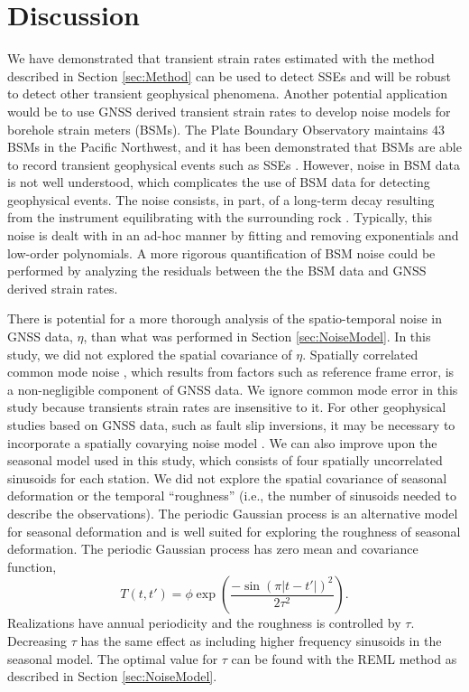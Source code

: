 \documentclass[10pt,letter]{article}
\begin{document}
\section{Discussion}\label{sec:Discussion}
We have demonstrated that transient strain rates estimated with the method described in Section \ref{sec:Method} can be used to detect SSEs and will be robust to detect other transient geophysical phenomena. Another potential application would be to use GNSS derived transient strain rates to develop noise models for borehole strain meters (BSMs). The Plate Boundary Observatory maintains 43 BSMs in the Pacific Northwest, and it has been demonstrated that BSMs are able to record transient geophysical events such as SSEs \citep[e.g.,][]{Dragert2011}. However, noise in BSM data is not well understood, which complicates the use of BSM data for detecting geophysical events. The noise consists, in part, of a long-term decay resulting from the instrument equilibrating with the surrounding rock \citep{Gladwin1987}. Typically, this noise is dealt with in an ad-hoc manner by fitting and removing exponentials and low-order polynomials. A more rigorous quantification of BSM noise could be performed by analyzing the residuals between the the BSM data and GNSS derived strain rates.    

There is potential for a more thorough analysis of the spatio-temporal noise in GNSS data, $\eta$, than what was performed in Section \ref{sec:NoiseModel}. In this study, we did not explored the spatial covariance of $\eta$. Spatially correlated common mode noise \citep{Wdowinski1997}, which results from factors such as reference frame error, is a non-negligible component of GNSS data. We ignore common mode error in this study because transients strain rates are insensitive to it. For other geophysical studies based on GNSS data, such as fault slip inversions, it may be necessary to incorporate a spatially covarying noise model \citep[e.g.,][]{Miyazaki2003}. We can also improve upon the seasonal model used in this study, which consists of four spatially uncorrelated sinusoids for each station. We did not explore the spatial covariance of seasonal deformation or the temporal ``roughness'' (i.e., the number of sinusoids needed to describe the observations). The periodic Gaussian process \citep{Mackay1998} is an alternative model for seasonal deformation and is well suited for exploring the roughness of seasonal deformation.  The periodic Gaussian process has zero mean and covariance function,
\begin{equation}\label{eq:Periodic}
T(t,t') = \phi \exp\left(\frac{-\sin(\pi|t - t'|)^2}{2\tau^2}\right).
\end{equation}
Realizations have annual periodicity and the roughness is controlled by $\tau$. Decreasing $\tau$ has the same effect as including higher frequency sinusoids in the seasonal model. The optimal value for $\tau$ can be found with the REML method as described in Section \ref{sec:NoiseModel}. 
\end{document}
